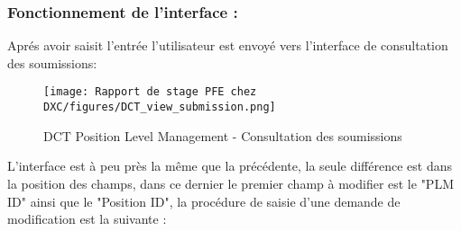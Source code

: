 
\subsubsection{Fonctionnement de l'interface :}

Aprés avoir saisit l'entrée l'utilisateur est envoyé vers l'interface de consultation des soumissions:

\begin{figure}[H]
    \centering
    \texttt{[image: Rapport de stage PFE chez DXC/figures/DCT\_view\_submission.png]}
    \caption{DCT Position Level Management - Consultation des soumissions}
\end{figure}

L'interface est à peu près la même que la précédente, la seule différence est dans la position des champs, dans ce dernier le premier champ à modifier est le "PLM ID" ainsi que le "Position ID", la procédure de saisie d'une demande de modification est la suivante :

